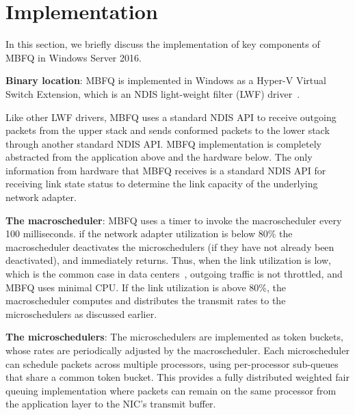 \section{Implementation}
\label{sec:implementation}
In this section, we briefly discuss the implementation of key components of MBFQ in Windows
Server 2016.

{\bf Binary location}: MBFQ is implemented in Windows as a Hyper-V Virtual
Switch Extension, which is an NDIS light-weight filter (LWF) driver~\cite{fd}.

Like other LWF drivers, MBFQ uses a standard NDIS API to receive outgoing
packets from the upper stack and sends conformed packets to the lower stack
through another standard NDIS API.  MBFQ implementation is completely abstracted
from the application above and the hardware below.  The only information from
hardware that MBFQ receives is a standard NDIS API for receiving link state
status to determine the link capacity of the underlying network adapter.

{\bf The macroscheduler}: MBFQ uses a timer to invoke the macroscheduler every
100 milliseconds. if the network adapter utilization is below 80\% the
macroscheduler deactivates the microschedulers (if they have not already been
deactivated), and immediately returns.  Thus, when the link utilization is low,
which is the common case in data centers~\cite{fb,kandula09}, outgoing traffic
is not throttled, and MBFQ uses minimal CPU.  If the link utilization is above
80\%, the macroscheduler computes and distributes the transmit rates to the
microschedulers as discussed earlier.

{\bf The microschedulers}: The microschedulers are implemented as token buckets,
whose rates are periodically adjusted by the macroscheduler.  Each
microscheduler can schedule packets across multiple processors, using
per-processor sub-queues that share a common token bucket.  This provides a
fully distributed weighted fair queuing implementation where packets can remain
on the same processor from the application layer to the NIC's transmit buffer.


